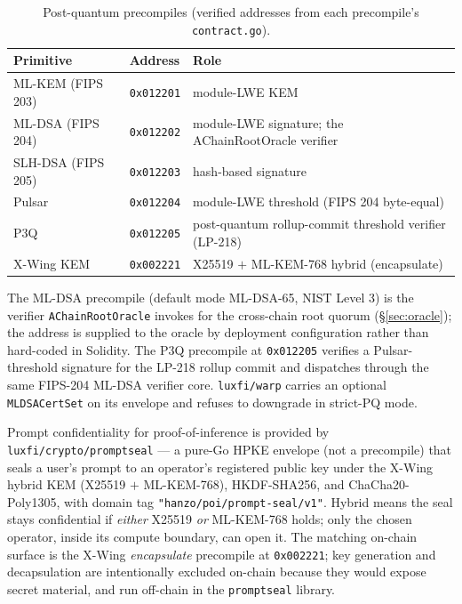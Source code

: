 \documentclass[11pt,a4paper]{article}
\begin{document}
\begin{table}[h]
\centering
\begin{tabular}{lll}
\toprule
\textbf{Primitive} & \textbf{Address} & \textbf{Role} \\
\midrule
ML-KEM (FIPS 203) & \texttt{0x012201} & module-LWE KEM \\
ML-DSA (FIPS 204) & \texttt{0x012202} & module-LWE signature; the AChainRootOracle verifier \\
SLH-DSA (FIPS 205) & \texttt{0x012203} & hash-based signature \\
Pulsar & \texttt{0x012204} & module-LWE threshold (FIPS 204 byte-equal) \\
P3Q & \texttt{0x012205} & post-quantum rollup-commit threshold verifier (LP-218) \\
X-Wing KEM & \texttt{0x002221} & X25519 $+$ ML-KEM-768 hybrid (encapsulate) \\
\bottomrule
\end{tabular}
\caption{Post-quantum precompiles (verified addresses from each precompile's \texttt{contract.go}).}
\end{table}

The ML-DSA precompile (default mode ML-DSA-65, NIST Level 3) is the verifier \texttt{AChainRootOracle} invokes for the cross-chain root quorum (\S\ref{sec:oracle}); the address is supplied to the oracle by deployment configuration rather than hard-coded in Solidity. The P3Q precompile at \texttt{0x012205} verifies a Pulsar-threshold signature for the LP-218 rollup commit and dispatches through the same FIPS-204 ML-DSA verifier core. \texttt{luxfi/warp} carries an optional \texttt{MLDSACertSet} on its envelope and refuses to downgrade in strict-PQ mode.

Prompt confidentiality for proof-of-inference is provided by \texttt{luxfi/crypto/promptseal} --- a pure-Go HPKE envelope (not a precompile) that seals a user's prompt to an operator's registered public key under the X-Wing hybrid KEM (X25519 $+$ ML-KEM-768), HKDF-SHA256, and ChaCha20-Poly1305, with domain tag \texttt{"hanzo/poi/prompt-seal/v1"}. Hybrid means the seal stays confidential if \emph{either} X25519 \emph{or} ML-KEM-768 holds; only the chosen operator, inside its compute boundary, can open it. The matching on-chain surface is the X-Wing \emph{encapsulate} precompile at \texttt{0x002221}; key generation and decapsulation are intentionally excluded on-chain because they would expose secret material, and run off-chain in the \texttt{promptseal} library.
\end{document}
